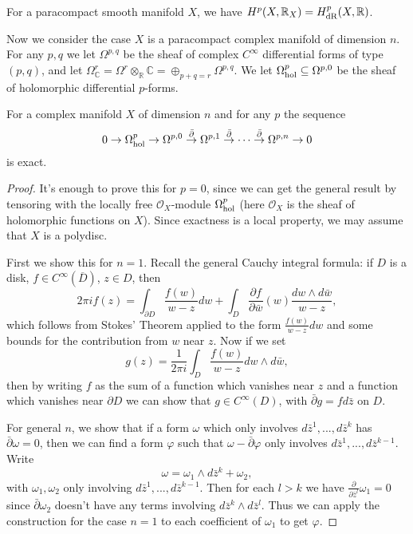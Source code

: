 \begin{thm}[de Rham] For a paracompact smooth manifold $X$, we have $H^p(X,\mathbb{R}_X) = H^p_{\rm dR}(X,\mathbb{R})$.
\end{thm}

Now we consider the case $X$ is a paracompact complex manifold of dimension $n$. For any $p,q$ we let $\Omega^{p,q}$ be the sheaf of complex $C^\infty$ differential forms of type $(p,q)$, and let $\Omega^r_\mathbb{C} = \Omega^r\otimes_\mathbb{R} \mathbb{C} = \oplus_{p+q=r} \Omega^{p,q}$. We let $\Omega^p_{\rm hol} \subseteq \Omega^{p,0}$ be the sheaf of holomorphic differential $p$-forms.

\begin{lem} For a complex manifold $X$ of dimension $n$ and for any $p$ the sequence
\[
0 \rightarrow \Omega^p_{\rm hol} \rightarrow \Omega^{p,0} \stackrel{\bar\partial}{\rightarrow} \Omega^{p,1} \stackrel{\bar\partial}{\rightarrow} \cdots \stackrel{\bar\partial}{\rightarrow} \Omega^{p,n} \rightarrow 0
\]
is exact.
\end{lem}
\begin{proof} It's enough to prove this for $p=0$, since we can get the general result by tensoring with the locally free $\mathcal{O}_X$-module $\Omega^p_{\rm hol}$ (here $\mathcal{O}_X$ is the sheaf of holomorphic functions on $X$). Since exactness is a local property, we may assume that $X$ is a polydisc.

First we show this for $n=1$. Recall the general Cauchy integral formula: if $D$ is a disk, $f\in C^\infty(\overline{D})$, $z\in D$, then
\[
2\pi if(z) = \int_{\partial D} \frac{f(w)}{w-z}dw + \int_D \frac{\partial f}{\partial \bar{w}}(w)\frac{dw\wedge d\bar{w}}{w-z},
\]
which follows from Stokes' Theorem applied to the form $\frac{f(w)}{w-z}dw$ and some bounds for the contribution from $w$ near $z$. Now if we set
\[
g(z) = \frac{1}{2\pi i}\int_D \frac{f(w)}{w-z}dw\wedge d\bar{w},
\]
then by writing $f$ as the sum of a function which vanishes near $z$ and a function which vanishes near $\partial D$ we can show that $g \in C^\infty(D)$, with $\bar\partial g = fd\bar{z}$ on $D$.

For general $n$, we show that if a form $\omega$ which only involves $d\bar{z}^1, ..., d\bar{z}^k$ has $\bar\partial \omega = 0$, then we can find a form $\varphi$ such that $\omega - \bar\partial\varphi$ only involves $d\bar{z}^1, ..., d\bar{z}^{k-1}$. Write
\[
\omega = \omega_1\wedge d\bar{z}^k + \omega_2,
\]
with $\omega_1, \omega_2$ only involving $d\bar{z}^1, ..., d\bar{z}^{k-1}$. Then for each $l > k$ we have $\frac{\partial}{\partial \bar{z}^l} \omega_1 = 0$ since $\bar\partial \omega_2$ doesn't have any terms involving $d\bar{z}^k\wedge d\bar{z}^l$. Thus we can apply the construction for the case $n=1$ to each coefficient of $\omega_1$ to get $\varphi$.
\end{proof}

